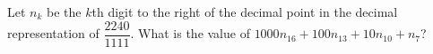 Let $n_k$ be the $k$th digit to the right of the decimal point in the decimal representation of $\dfrac{2240}{1111}$. What is the value of $1000n_{16}+100n_{13}+10n_{10}+n_7$?
